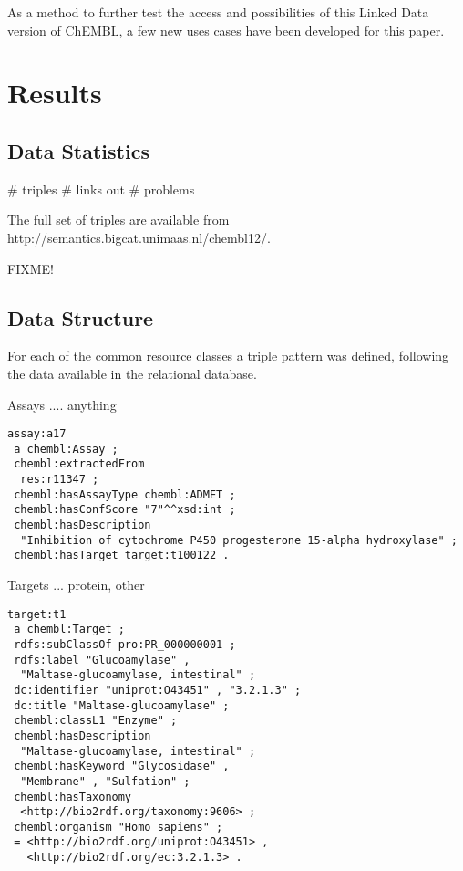 \documentclass[sw]{iosart2c}
\begin{document}
As a method to further test the access and possibilities of this Linked Data version of
ChEMBL, a few new uses cases have been developed for this paper.

\section{Results}\label{s3}

\subsection{Data Statistics}

\# triples
\# links out
\# problems

The full set of triples are available from http://semantics.bigcat.unimaas.nl/chembl12/.

FIXME!

\subsection{Data Structure}

For each of the common resource classes a triple pattern was defined, following the
data available in the relational database.

Assays .... anything

\begin{small}
\begin{verbatim}
assay:a17
 a chembl:Assay ;
 chembl:extractedFrom
  res:r11347 ;
 chembl:hasAssayType chembl:ADMET ;
 chembl:hasConfScore "7"^^xsd:int ;
 chembl:hasDescription
  "Inhibition of cytochrome P450 progesterone 15-alpha hydroxylase" ;
 chembl:hasTarget target:t100122 .
\end{verbatim}
\end{small}

Targets ... protein, other

\begin{small}
\begin{verbatim}
target:t1
 a chembl:Target ;
 rdfs:subClassOf pro:PR_000000001 ;
 rdfs:label "Glucoamylase" , 
  "Maltase-glucoamylase, intestinal" ;
 dc:identifier "uniprot:O43451" , "3.2.1.3" ;
 dc:title "Maltase-glucoamylase" ;
 chembl:classL1 "Enzyme" ;
 chembl:hasDescription
  "Maltase-glucoamylase, intestinal" ;
 chembl:hasKeyword "Glycosidase" , 
  "Membrane" , "Sulfation" ;
 chembl:hasTaxonomy
  <http://bio2rdf.org/taxonomy:9606> ;
 chembl:organism "Homo sapiens" ;
 = <http://bio2rdf.org/uniprot:O43451> , 
   <http://bio2rdf.org/ec:3.2.1.3> .
\end{verbatim}
\end{small}
\end{document}
